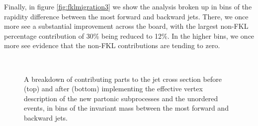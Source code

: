 Finally, in figure \ref{fig:fklmigration3} we show the analysis broken up in bins of the rapidity difference between the most forward and backward jets. There, we once more see a substantial improvement across the board, with the largest non-FKL percentage contribution of 30\% being reduced to 12\%. In the higher bins, we once more see evidence that the non-FKL contributions are tending to zero. 

\begin{figure}[H] 
\centering
{} \\
\caption{A breakdown of contributing parts to the jet cross section before (top) and after (bottom) implementing the effective vertex description of the new partonic subprocesses and the unordered events, in bins of the invariant mass between the most forward and backward jets.}
\label{fig:fklmigration}
\end{figure}

